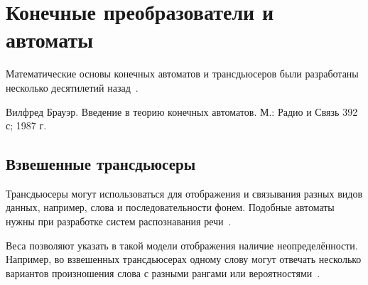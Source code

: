 \section{Конечные преобразователи и автоматы} \label{sect_review_automaton}

Математические основы конечных автоматов и трансдьюсеров были разработаны 
несколько десятилетий назад~\cite{MohriChapter4Lothaire2005applied}.


Вилфред Брауэр. Введение в теорию конечных автоматов. М.: Радио и Связь 392 с; 
1987 г. 




\subsection{Взвешенные трансдьюсеры} \label{sect_weighted_transducers}

Трансдьюсеры могут использоваться для отображения и связывания разных видов данных, 
например, слова и последовательности фонем. 
Подобные автоматы нужны при разработке систем распознавания речи~\cite[с.~200]{MohriChapter4Lothaire2005applied}.

Веса позволяют указать в такой модели отображения наличие неопределённости. 
Например, во взвешенных трансдьюсерах одному слову могут отвечать несколько вариантов 
произношения слова с разными рангами или вероятностями~\cite[с.~200]{MohriChapter4Lothaire2005applied}.







